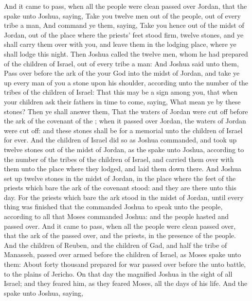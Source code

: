 \begin{biblechapter} %
\verse And it came to pass, when all the people were clean passed over Jordan, that the \LORD spake unto Joshua, saying,
\verse Take you twelve men out of the people, out of every tribe a man,
\verse And command ye them, saying, Take you hence out of the midst of Jordan, out of the place where the priests' feet stood firm, twelve stones, and ye shall carry them over with you, and leave them in the lodging place, where ye shall lodge this night.
\verse Then Joshua called the twelve men, whom he had prepared of the children of Israel, out of every tribe a man:
\verse And Joshua said unto them, Pass over before the ark of the \LORD your God into the midst of Jordan, and take ye up every man of you a stone upon his shoulder, according unto the number of the tribes of the children of Israel:
\verse That this may be a sign among you, that when your children ask their fathers in time to come, saying, What mean ye by these stones?
\verse Then ye shall answer them, That the waters of Jordan were cut off before the ark of the covenant of the \LORD; when it passed over Jordan, the waters of Jordan were cut off: and these stones shall be for a memorial unto the children of Israel for ever.
\verse And the children of Israel did so as Joshua commanded, and took up twelve stones out of the midst of Jordan, as the \LORD spake unto Joshua, according to the number of the tribes of the children of Israel, and carried them over with them unto the place where they lodged, and laid them down there.
\verse And Joshua set up twelve stones in the midst of Jordan, in the place where the feet of the priests which bare the ark of the covenant stood: and they are there unto this day.
\verse For the priests which bare the ark stood in the midst of Jordan, until every thing was finished that the \LORD commanded Joshua to speak unto the people, according to all that Moses commanded Joshua: and the people hasted and passed over.
\verse And it came to pass, when all the people were clean passed over, that the ark of the \LORD passed over, and the priests, in the presence of the people.
\verse And the children of Reuben, and the children of Gad, and half the tribe of Manasseh, passed over armed before the children of Israel, as Moses spake unto them:
\verse About forty thousand prepared for war passed over before the \LORD unto battle, to the plains of Jericho.
\verse On that day the \LORD magnified Joshua in the sight of all Israel; and they feared him, as they feared Moses, all the days of his life.
\verse And the \LORD spake unto Joshua, saying,

\end{biblechapter}
